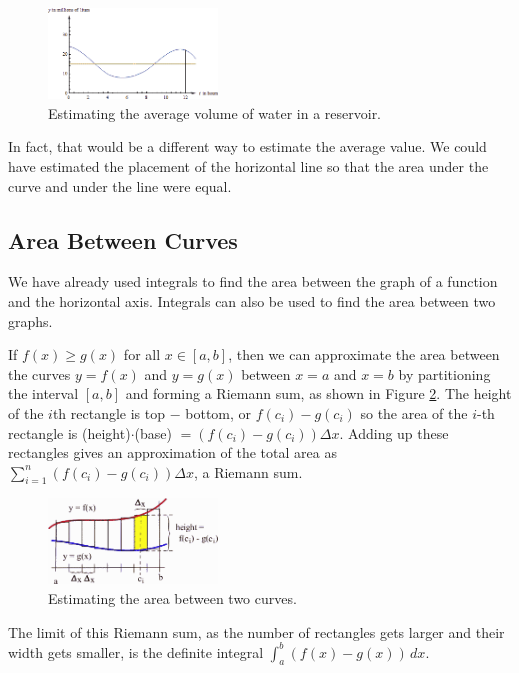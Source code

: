 \begin{example}
\begin{solution}
\begin{figure}[!ht]
  \centering
    \includegraphics[width=0.4\textwidth]{img/chap5/image057.png}
    \caption{Estimating the average volume of water in a reservoir.}
    \label{fig:5-8-reservoiravg}
\end{figure}

In fact, that would be a different way to estimate the average value. We could have estimated the placement of the horizontal line so that the area under the curve and under the line were equal.
\end{solution}\end{example}

\subsection{Area Between Curves}
We have already used integrals to find the area between the graph of a function and the horizontal axis. Integrals can also be used to find the area between two graphs.

If $f(x) \geq g(x)$ for all $x \in [a,b]$, then we can approximate the area between the curves $y=f(x)$ and $y=g(x)$ between $x=a$ and $x=b$ by partitioning the interval $[a,b]$ and forming a Riemann sum, as shown in Figure \ref{fig:5-8-abc}. The height of the $i$th rectangle is top $-$ bottom, or $f(c_i)-g(c_i)$ so the area of the $i$-th rectangle is (height)$\cdot$(base) $= (f(c_i)-g(c_i))\Delta x$. Adding up these rectangles gives an approximation of the total area as $\displaystyle\sum_{i=1}^n(f(c_i)-g(c_i))\Delta x$, a Riemann sum.

\begin{figure}[!ht]
  \centering
    \includegraphics[width=0.4\textwidth]{img/chap5/image049.png}
    \caption{Estimating the area between two curves.}
    \label{fig:5-8-abc}
\end{figure}
The limit of this Riemann sum, as the number of rectangles gets larger and their width gets smaller, is the definite integral $\displaystyle\int_a^b(f(x)-g(x))\,dx$.


